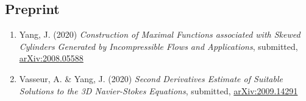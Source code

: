 \documentclass[margin,line]{res}
\newenvironment{list2}{
  \begin{list}{$\bullet$}{%
      \setlength{\itemsep}{0in}
      \setlength{\parsep}{0in} \setlength{\parskip}{0in}
      \setlength{\topsep}{0in} \setlength{\partopsep}{0in} 
      \setlength{\leftmargin}{0.2in}}}{\end{list}}
\begin{document}
\begin{resume}

\section{\sc Preprint}

\begin{enumerate}[\hspace{-.13in}1.]
    \item Yang, J. (2020) \textit{Construction of Maximal Functions associated with Skewed Cylinders Generated by Incompressible Flows and Applications}, submitted, \href{https://arxiv.org/abs/2008.05588}{arXiv:2008.05588}
    \item Vasseur, A. \& Yang, J. (2020) \textit{Second Derivatives Estimate of Suitable Solutions to the 3D Navier-Stokes Equations}, submitted, \href{https://arxiv.org/abs/2009.14291}{arXiv:2009.14291}
\end{enumerate}





\end{resume}
\end{document}

